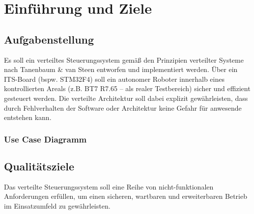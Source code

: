 \chapter{Einführung und Ziele}

\section{Aufgabenstellung}

Es soll ein verteiltes Steuerungssystem gemäß den Prinzipien verteilter Systeme nach Tanenbaum \& van Steen entworfen und implementiert werden. Über ein ITS-Board (bspw. STM32F4) soll ein autonomer Roboter innerhalb eines kontrollierten Areals (z.B. BT7 R7.65 – als realer Testbereich) sicher und effizient gesteuert werden. Die verteilte Architektur soll dabei explizit gewährleisten, dass durch Fehlverhalten der Software oder Architektur keine Gefahr für anwesende entstehen kann.


\subsection*{Use Case Diagramm} %


\section{Qualitätsziele}

Das verteilte Steuerungssystem soll eine Reihe von nicht-funktionalen Anforderungen erfüllen, um einen sicheren, wartbaren und erweiterbaren Betrieb im Einsatzumfeld zu gewährleisten. 

